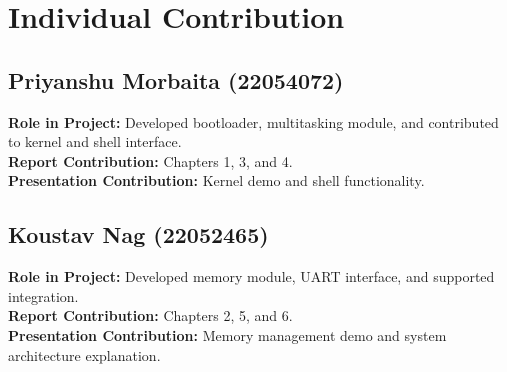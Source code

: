 \documentclass[a4paper,12pt]{report}
\begin{document}
\chapter*{Individual Contribution}
\section*{Priyanshu Morbaita (22054072)}
\textbf{Role in Project:} Developed bootloader, multitasking module, and contributed to kernel and shell interface. \\ 
\textbf{Report Contribution:} Chapters 1, 3, and 4. \\ 
\textbf{Presentation Contribution:} Kernel demo and shell functionality.

\section*{Koustav Nag (22052465)}
\textbf{Role in Project:} Developed memory module, UART interface, and supported integration. \\ 
\textbf{Report Contribution:} Chapters 2, 5, and 6. \\ 
\textbf{Presentation Contribution:} Memory management demo and system architecture explanation.
\end{document}
